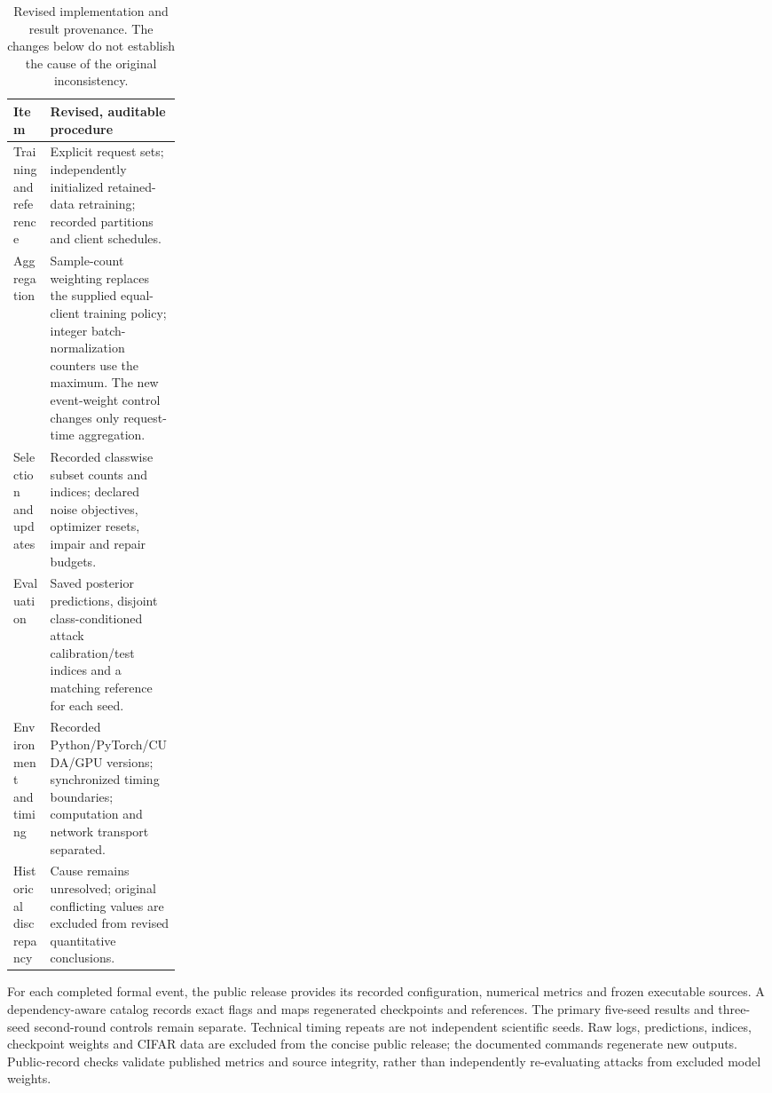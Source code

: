 \documentclass[software,article,submit,moreauthors]{Definitions/mdpi}
\begin{document}
\begin{table}[htbp]\centering\small
\caption{Revised implementation and result provenance. The changes below do not
establish the cause of the original inconsistency.}\label{tab:provenance}
\begin{tabularx}{\linewidth}{p{0.22\linewidth}X}\toprule
Item & Revised, auditable procedure\\\midrule
Training and reference & Explicit request sets; independently initialized
retained-data retraining; recorded partitions and client schedules.\\
Aggregation & Sample-count weighting replaces the supplied equal-client
training policy; integer batch-normalization counters use the maximum. The
new event-weight control changes only request-time aggregation.\\
Selection and updates & Recorded classwise subset counts and indices;
declared noise objectives, optimizer resets, impair and repair budgets.\\
Evaluation & Saved posterior predictions, disjoint class-conditioned attack
calibration/test indices and a matching reference for each seed.\\
Environment and timing & Recorded Python/PyTorch/CUDA/GPU versions;
synchronized timing boundaries; computation and network transport separated.\\
Historical discrepancy & Cause remains unresolved; original conflicting
values are excluded from revised quantitative conclusions.\\\bottomrule
\end{tabularx}\end{table}

For each completed formal event, the public release provides its recorded
configuration, numerical metrics and frozen executable sources. A dependency-aware
catalog records exact flags and maps regenerated checkpoints and references.
The primary five-seed results and three-seed second-round controls remain
separate. Technical timing repeats are not independent scientific seeds.
Raw logs, predictions, indices, checkpoint weights and CIFAR data are excluded
from the concise public release; the documented commands regenerate new outputs.
Public-record checks validate published metrics and source integrity, rather
than independently re-evaluating attacks from excluded model weights.
\end{document}
